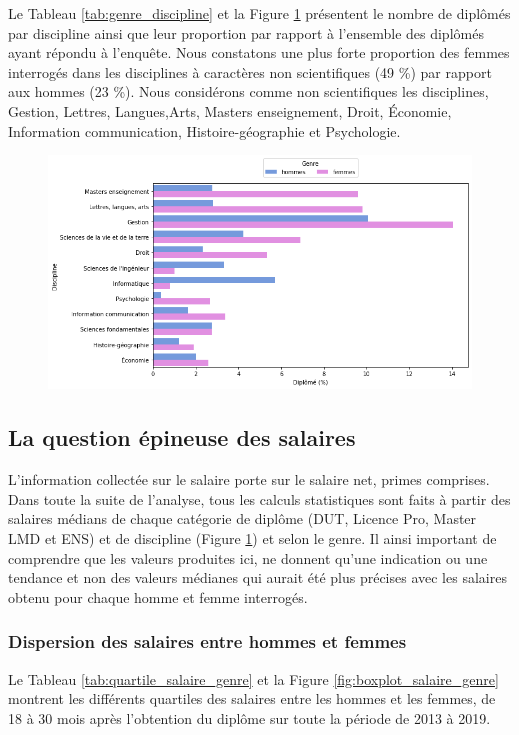 \documentclass[12pt, a4paper, titlepage, table]{article}
\begin{document}
	
	Le Tableau \ref{tab:genre_discipline} et la Figure \ref{fig:genre_discipline} présentent le nombre de diplômés par discipline ainsi que leur proportion par rapport à l'ensemble des diplômés ayant répondu à l'enquête.
	Nous constatons une plus forte proportion des femmes interrogés dans les disciplines à caractères non scientifiques (49 \%) par rapport aux hommes (23 \%).
	Nous considérons comme non scientifiques les  disciplines, Gestion, Lettres, Langues,Arts, Masters enseignement, Droit, Économie, Information communication, Histoire-géographie et Psychologie.
	
	
	

	\begin{figure}[H]
		\centering
		\includegraphics[width=1\textwidth]{../graphs/proportion_disciplines.png}
		\label{fig:genre_discipline}
	\end{figure}

\subsection{La question épineuse des salaires}
L’information collectée sur le salaire porte sur le salaire net, primes comprises. Dans toute la suite de l'analyse, tous les calculs statistiques sont faits à partir des salaires médians de chaque catégorie de diplôme (DUT, Licence Pro, Master LMD et ENS) et de discipline (Figure \ref{fig:genre_discipline}) et selon le genre. Il ainsi important de comprendre que les valeurs produites ici,  ne donnent qu'une indication ou une tendance et non des valeurs médianes qui aurait été plus précises avec les salaires obtenu pour chaque homme et femme interrogés.
 

	\subsubsection{Dispersion des salaires entre hommes et femmes}	
	Le Tableau \ref{tab:quartile_salaire_genre} et la Figure \ref{fig:boxplot_salaire_genre} montrent les différents quartiles des salaires entre les hommes et les femmes, de 18 à 30 mois après l'obtention du diplôme sur toute la période de 2013 à 2019.
	
\end{document}
